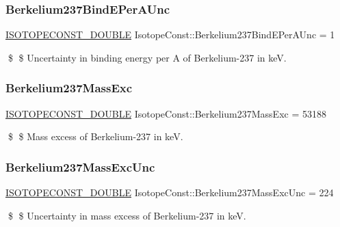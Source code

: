 \subsubsection{\texorpdfstring{Berkelium237\+Bind\+E\+Per\+A\+Unc}{Berkelium237BindEPerAUnc}}
{\footnotesize\ttfamily \mbox{\hyperlink{group___isotope_const-_macros_ga8f45a7272ce02c0b4c65c44636ed719a}{I\+S\+O\+T\+O\+P\+E\+C\+O\+N\+S\+T\+\_\+\+D\+O\+U\+B\+LE}} Isotope\+Const\+::\+Berkelium237\+Bind\+E\+Per\+A\+Unc = 1}

\$ \$ Uncertainty in binding energy per A of Berkelium-\/237 in keV. \mbox{\label{group___isotope_const-_berkelium-_bk237_gae7065b0ab7fdc95f36bc361900e20461}} 
\subsubsection{\texorpdfstring{Berkelium237\+Mass\+Exc}{Berkelium237MassExc}}
{\footnotesize\ttfamily \mbox{\hyperlink{group___isotope_const-_macros_ga8f45a7272ce02c0b4c65c44636ed719a}{I\+S\+O\+T\+O\+P\+E\+C\+O\+N\+S\+T\+\_\+\+D\+O\+U\+B\+LE}} Isotope\+Const\+::\+Berkelium237\+Mass\+Exc = 53188}

\$ \$ Mass excess of Berkelium-\/237 in keV. \mbox{\label{group___isotope_const-_berkelium-_bk237_ga67ecd9a6124dbbe97a1c5bd67759c0fc}} 
\subsubsection{\texorpdfstring{Berkelium237\+Mass\+Exc\+Unc}{Berkelium237MassExcUnc}}
{\footnotesize\ttfamily \mbox{\hyperlink{group___isotope_const-_macros_ga8f45a7272ce02c0b4c65c44636ed719a}{I\+S\+O\+T\+O\+P\+E\+C\+O\+N\+S\+T\+\_\+\+D\+O\+U\+B\+LE}} Isotope\+Const\+::\+Berkelium237\+Mass\+Exc\+Unc = 224}

\$ \$ Uncertainty in mass excess of Berkelium-\/237 in keV. \mbox{\label{group___isotope_const-_berkelium-_bk237_gae95d269089a2bb50e2aa6d2c2cc1bcd0}} 
